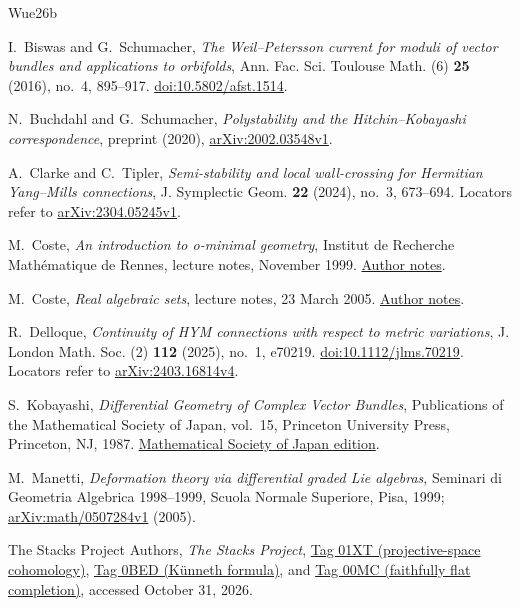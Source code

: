 \documentclass[11pt]{amsart}
\theoremstyle{definition}
\theoremstyle{remark}
\begin{document}
\FloatBarrier
\begin{thebibliography}{Wue26b}

I.~Biswas and G.~Schumacher,
\emph{The Weil--Petersson current for moduli of vector bundles and applications to orbifolds},
Ann. Fac. Sci. Toulouse Math. (6) \textbf{25} (2016), no.~4, 895--917.
\href{https://doi.org/10.5802/afst.1514}{doi:10.5802/afst.1514}.

N.~Buchdahl and G.~Schumacher,
\emph{Polystability and the Hitchin--Kobayashi correspondence}, preprint (2020),
\href{https://arxiv.org/abs/2002.03548v1}{arXiv:2002.03548v1}.

A.~Clarke and C.~Tipler,
\emph{Semi-stability and local wall-crossing for Hermitian Yang--Mills connections},
J. Symplectic Geom. \textbf{22} (2024), no.~3, 673--694.
Locators refer to \href{https://arxiv.org/abs/2304.05245v1}{arXiv:2304.05245v1}.

M.~Coste, \emph{An introduction to o-minimal geometry},
Institut de Recherche Math\'ematique de Rennes, lecture notes, November 1999.
\href{https://perso.univ-rennes1.fr/michel.coste/polyens/OMIN.pdf}{Author notes}.

M.~Coste, \emph{Real algebraic sets}, lecture notes, 23 March 2005.
\href{https://perso.univ-rennes1.fr/michel.coste/polyens/RASroot.pdf}{Author notes}.

R.~Delloque, \emph{Continuity of HYM connections with respect to metric variations},
J. London Math. Soc. (2) \textbf{112} (2025), no.~1, e70219.
\href{https://doi.org/10.1112/jlms.70219}{doi:10.1112/jlms.70219}.
Locators refer to \href{https://arxiv.org/abs/2403.16814v4}{arXiv:2403.16814v4}.

S.~Kobayashi, \emph{Differential Geometry of Complex Vector Bundles},
Publications of the Mathematical Society of Japan, vol.~15,
Princeton University Press, Princeton, NJ, 1987.
\href{https://www.mathsoc.jp/assets/pdf/publications/pubmsj/Vol15.pdf}{Mathematical Society of Japan edition}.

M.~Manetti, \emph{Deformation theory via differential graded Lie algebras},
Seminari di Geometria Algebrica 1998--1999, Scuola Normale Superiore,
Pisa, 1999; \href{https://arxiv.org/abs/math/0507284v1}{arXiv:math/0507284v1} (2005).

The Stacks Project Authors, \emph{The Stacks Project},
\href{https://stacks.math.columbia.edu/tag/01XT}{Tag 01XT (projective-space cohomology)},
\href{https://stacks.math.columbia.edu/tag/0BED}{Tag 0BED (K\"unneth formula)}, and
\href{https://stacks.math.columbia.edu/tag/00MC}{Tag 00MC (faithfully flat completion)},
accessed October 31, 2026.


\end{thebibliography}
\end{document}
